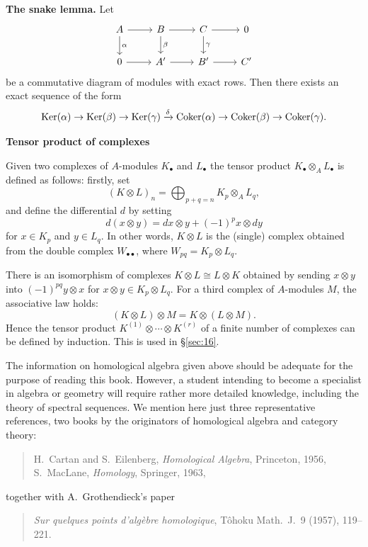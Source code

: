 \medskip
\noindent\textbf{The snake lemma.} Let
\[
\begin{tikzcd}
A \arrow[r] \arrow[d, "\alpha"] & B \arrow[r] \arrow[d, "\beta"] & C \arrow[r] \arrow[d, "\gamma"] & 0 \\
0 \arrow[r] & A' \arrow[r] & B' \arrow[r] & C'
\end{tikzcd}
\]
be a commutative diagram of modules with exact rows. Then there exists an
exact sequence of the form
\[
  \operatorname{Ker}(\alpha) \to \operatorname{Ker}(\beta) \to \operatorname{Ker}(\gamma) \xrightarrow{\delta}
  \operatorname{Coker}(\alpha) \to \operatorname{Coker}(\beta) \to \operatorname{Coker}(\gamma).
\]

\medskip
\noindent\textbf{Tensor product of complexes}

Given two complexes of $A$-modules $K_\bullet$ and $L_\bullet$ the tensor product
$K_\bullet \otimes_A L_\bullet$ is defined as follows: firstly, set
\[
  (K \otimes L)_n = \bigoplus_{p + q = n} K_p \otimes_A L_q,
\]
and define the differential $d$ by setting
\[
  d(x \otimes y) = dx \otimes y + (-1)^p x \otimes dy
\]
for $x \in K_p$ and $y \in L_q$. In other words, $K \otimes L$ is the (single) complex obtained
from the double complex $W_{\bullet\bullet}$, where $W_{pq} = K_p \otimes L_q$.

There is an isomorphism of complexes $K \otimes L \cong L \otimes K$ obtained by sending
$x \otimes y$ into $(-1)^{pq}y \otimes x$ for $x \otimes y \in K_p \otimes L_q$. For a third complex of
$A$-modules $M$, the associative law holds:
\[
  (K \otimes L) \otimes M = K \otimes (L \otimes M).
\]
Hence the tensor product $K^{(1)} \otimes \cdots \otimes K^{(r)}$ of a finite number of complexes
can be defined by induction. This is used in \S\ref{sec:16}.

The information on homological algebra given above should be adequate for
the purpose of reading this book. However, a student intending to become a
specialist in algebra or geometry will require rather more detailed knowledge,
including the theory of spectral sequences. We mention here just three
representative references, two books by the originators of homological algebra
and category theory:
\begin{quote}
  H.~Cartan and S.~Eilenberg, \emph{Homological Algebra}, Princeton, 1956,\\
  S.~MacLane, \emph{Homology}, Springer, 1963,
\end{quote}
together with A.~Grothendieck's paper
\begin{quote}
  \emph{Sur quelques points d'alg\`ebre homologique}, T\^ohoku Math.~J.~9 (1957), 119--221.
\end{quote}

